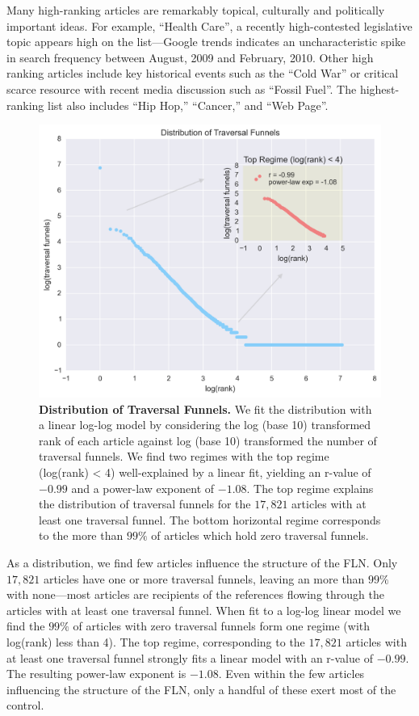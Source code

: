 \documentclass[pre,twocolumn,twoside,superscriptaddress,floatfix, aps, 10pt]{revtex4-1}
\begin{document}
Many high-ranking articles are remarkably topical, culturally and politically important ideas.  For example, ``Health Care'', a recently high-contested legislative topic appears high on the list---Google trends indicates an uncharacteristic spike in search frequency between August, 2009 and February, 2010.
Other high ranking articles include key historical events such as the ``Cold War'' or critical scarce resource with recent 
media discussion such as ``Fossil Fuel''. 
The highest-ranking list also includes ``Hip Hop,'' ``Cancer,'' and ``Web Page''.
\begin{figure}[tp!]
  \centering	
  \includegraphics[width=\columnwidth]{graphics/funnels_distribution.png}
  \caption{
    \textbf{Distribution of Traversal Funnels.}
  We fit the distribution with a linear log-log model by considering the log (base 10) transformed rank of each article against log (base 10) transformed the number of traversal funnels. 
  We find two regimes with the top regime (log(rank) < 4) 
  well-explained by a linear fit, yielding an r-value of $-0.99$ and a 
  power-law exponent of $-1.08$. The top regime 
  explains the distribution of traversal funnels for the $17, 821$ 
  articles with at least one traversal funnel. The bottom 
  horizontal regime corresponds to the more than $99\%$ of articles
  which hold zero traversal funnels.
  }
  \label{fig:Funnels Distribution}
\end{figure}

As a distribution, we find few articles influence the structure of the 
FLN. Only $17, 821$ articles have one or more traversal funnels, leaving
an more than $99\%$ with none---most articles are recipients of 
the references flowing through the articles with at least one traversal funnel.
When fit to a log-log linear model we find the $99\%$ of articles with zero
traversal funnels form one regime (with log(rank) less than 4).
The top regime, corresponding to the $17, 821$ articles with at least one 
traversal funnel strongly fits a linear model with an r-value of $-0.99$. 
The resulting power-law exponent is $-1.08$. Even within the few articles
influencing the structure of the FLN, only a handful of these exert most of the 
control. 
\end{document}
